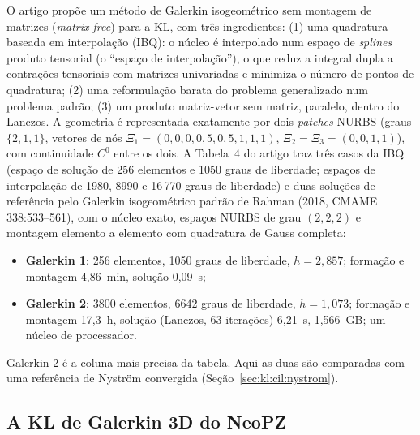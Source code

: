 O artigo propõe um método de Galerkin isogeométrico sem montagem de matrizes (\emph{matrix-free}) para a KL, com três
ingredientes: (1) uma quadratura baseada em interpolação (IBQ): o núcleo é interpolado num espaço de \emph{splines}
produto tensorial (o ``espaço de interpolação''), o que reduz a integral dupla a contrações tensoriais com matrizes
univariadas e minimiza o número de pontos de quadratura; (2) uma reformulação barata do problema generalizado num
problema padrão; (3) um produto matriz-vetor sem matriz, paralelo, dentro do Lanczos. A geometria é representada
exatamente por dois \emph{patches} NURBS (graus $\{2, 1, 1\}$, vetores de nós
$\Xi_1 = (0, 0, 0, 0{,}5, 0{,}5, 1, 1, 1)$, $\Xi_2 = \Xi_3 = (0, 0, 1, 1)$), com continuidade $C^0$ entre os dois.
A Tabela~4 do artigo traz três casos da IBQ (espaço de solução de 256 elementos e 1050 graus de liberdade; espaços de
interpolação de 1980, 8990 e 16\,770 graus de liberdade) e duas soluções de referência pelo Galerkin isogeométrico
padrão de Rahman (2018, CMAME 338:533--561), com o núcleo exato, espaços NURBS de grau $(2, 2, 2)$ e montagem elemento a elemento com
quadratura de Gauss completa:
\begin{itemize}
  \item \textbf{Galerkin 1}: 256 elementos, 1050 graus de liberdade, $h = 2{,}857$; formação e montagem 4,86~min,
    solução 0,09~s;
  \item \textbf{Galerkin 2}: 3800 elementos, 6642 graus de liberdade, $h = 1{,}073$; formação e montagem 17,3~h,
    solução (Lanczos, 63 iterações) 6,21~s, 1,566~GB; um núcleo de processador.
\end{itemize}
Galerkin 2 é a coluna mais precisa da tabela. Aqui as duas são comparadas com uma referência de Nyström convergida
(Seção~\ref{sec:kl:cil:nystrom}).

\subsection{A KL de Galerkin 3D do NeoPZ}\label{sec:kl:cil:galerkin}


